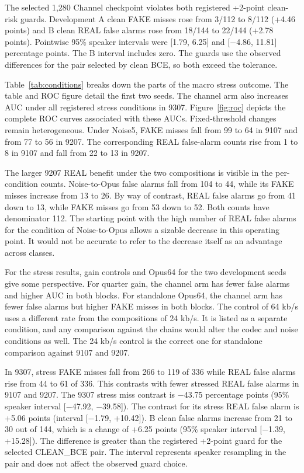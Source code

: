 The selected 1,280 Channel checkpoint violates both registered +2-point clean-risk guards. Development A clean FAKE misses rose from 3/112 to 8/112 (+4.46 points) and B clean REAL false alarms rose from 18/144 to 22/144 (+2.78 points). Pointwise 95\% speaker intervals were [1.79, 6.25] and [\ensuremath{-}4.86, 11.81] percentage points. The B interval includes zero. The guards use the observed differences for the pair selected by clean BCE, so both exceed the tolerance.

Table~\ref{tab:conditions} breaks down the parts of the macro stress outcome. The table and ROC figure detail the first two seeds. The channel arm also increases AUC under all registered stress conditions in 9307. Figure~\ref{fig:roc} depicts the complete ROC curves associated with these AUCs. Fixed-threshold changes remain heterogeneous. Under Noise5, FAKE misses fall from 99 to 64 in 9107 and from 77 to 56 in 9207. The corresponding REAL false-alarm counts rise from 1 to 8 in 9107 and fall from 22 to 13 in 9207.





The larger 9207 REAL benefit under the two compositions is visible in the per-condition counts. Noise-to-Opus false alarms fall from 104 to 44, while its FAKE misses increase from 13 to 26. By way of contrast, REAL false alarms go from 41 down to 13, while FAKE misses go from 53 down to 52. Both counts have denominator 112. The starting point with the high number of REAL false alarms for the condition of Noise-to-Opus allows a sizable decrease in this operating point. It would not be accurate to refer to the decrease itself as an advantage across classes.

For the stress results, gain controls and Opus64 for the two development seeds give some perspective. For quarter gain, the channel arm has fewer false alarms and higher AUC in both blocks. For standalone Opus64, the channel arm has fewer false alarms but higher FAKE misses in both blocks. The control of 64 kb/s uses a different rate from the compositions of 24 kb/s. It is listed as a separate condition, and any comparison against the chains would alter the codec and noise conditions as well. The 24 kb/s control is the correct one for standalone comparison against 9107 and 9207.

In 9307, stress FAKE misses fall from 266 to 119 of 336 while REAL false alarms rise from 44 to 61 of 336. This contrasts with fewer stressed REAL false alarms in 9107 and 9207. The 9307 stress miss contrast is \ensuremath{-}43.75 percentage points (95\% speaker interval [\ensuremath{-}47.92, \ensuremath{-}39.58]). The contrast for its stress REAL false alarm is +5.06 points (interval [\ensuremath{-}1.79, +10.42]). B clean false alarms increase from 21 to 30 out of 144, which is a change of +6.25 points (95\% speaker interval [\ensuremath{-}1.39, +15.28]). The difference is greater than the registered +2-point guard for the selected CLEAN\_BCE pair. The interval represents speaker resampling in the pair and does not affect the observed guard choice.

